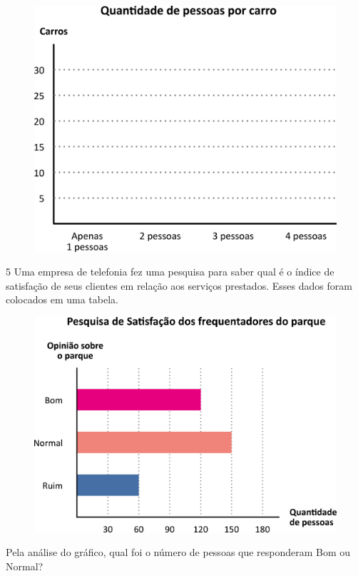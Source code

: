 \begin{figure}[htpb!]
\centering
\includegraphics[width=\textwidth]{./media/image81.png}
\end{figure}

\num{5} Uma empresa de telefonia fez uma pesquisa para saber qual é o índice de
satisfação de seus clientes em relação aos serviços prestados. Esses dados foram
colocados em uma tabela.

\begin{figure}[htpb!]
\centering
\includegraphics[width=.8\textwidth]{./media/image82.png}
\end{figure}

Pela análise do gráfico, qual foi o número de pessoas que
responderam Bom ou Normal? 


